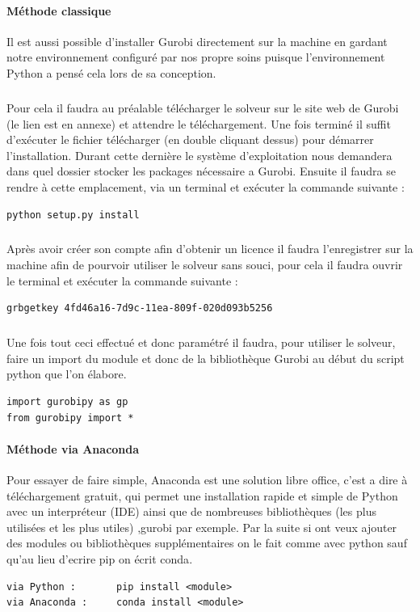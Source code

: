 \documentclass[a4paper, 12pt, twoside]{article}
\begin{document}
\paragraph{Méthode classique }Il est aussi possible d'installer \textsf{Gurobi} directement sur la machine en gardant notre environnement configuré par nos propre soins puisque l'environnement Python a pensé cela lors de sa conception.
\subparagraph{}{Pour cela il faudra au préalable télécharger le solveur sur le site web de \textsf{Gurobi} (le lien est en annexe) et attendre le téléchargement. Une fois terminé il suffit d'exécuter le fichier télécharger (en double cliquant dessus) pour démarrer l'installation. Durant cette dernière le système d'exploitation nous demandera dans quel dossier stocker les packages nécessaire a \textsf{Gurobi}. Ensuite il faudra se rendre à cette emplacement, via un terminal et exécuter la commande suivante :}
\begin{verbatim}
python setup.py install
\end{verbatim}
\subparagraph{}{Après avoir créer son compte afin d'obtenir un licence il faudra l'enregistrer sur la machine afin de pourvoir utiliser le solveur sans souci, pour cela il faudra ouvrir le terminal et exécuter la commande suivante :}
\begin{verbatim}
grbgetkey 4fd46a16-7d9c-11ea-809f-020d093b5256
\end{verbatim}
\subparagraph{}{Une fois tout ceci effectué et donc paramétré il faudra, pour utiliser le solveur, faire un \textsf{import} du module et donc de la bibliothèque \textsf{Gurobi} au début du script python que l'on élabore.}
\begin{verbatim}
import gurobipy as gp
from gurobipy import *
\end{verbatim}

\paragraph{Méthode via Anaconda}{Pour essayer de faire simple, Anaconda est une solution libre office, c'est a dire à téléchargement gratuit, qui permet une installation rapide et simple de \textsf{Python} avec un interpréteur (IDE) ainsi que de nombreuses bibliothèques (les plus utilisées et les plus utiles) ,gurobi par exemple. Par la suite si ont veux ajouter des modules ou bibliothèques supplémentaires  on le fait comme avec python sauf qu'au lieu d'ecrire \textsf{pip} on écrit \textsf{conda}}.
\begin{verbatim}
via Python :       pip install <module>
via Anaconda :     conda install <module>
\end{verbatim}
\end{document}
